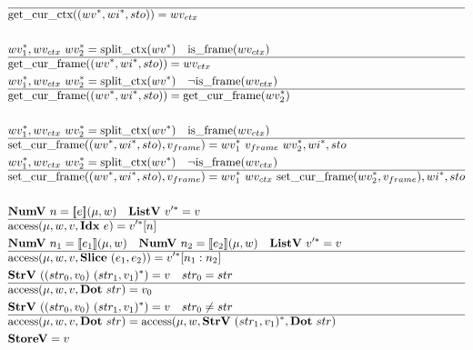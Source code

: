 \begin{align*}
  \hline
  &\getcurctx((\seq{wv}, \seq{wi}, sto)) = wv_{ctx} \\
%
\newline \\
  &\seq{wv_1}, wv_{ctx} ~ \seq{wv_2} = \splitctx(\seq{wv}) \quad \isframe(wv_{ctx}) \\
  \hline
  &\getcurframe((\seq{wv}, \seq{wi}, sto)) = wv_{ctx} \\
  &\seq{wv_1}, wv_{ctx} ~ \seq{wv_2} = \splitctx(\seq{wv}) \quad \neg \isframe(wv_{ctx}) \\
  \hline
  &\getcurframe((\seq{wv}, \seq{wi}, sto)) = \getcurframe(\seq{wv_2}) \\
%
\newline \\
  &\seq{wv_1}, wv_{ctx} ~ \seq{wv_2} = \splitctx(\seq{wv}) \quad \isframe(wv_{ctx}) \\
  \hline
  &\setcurframe((\seq{wv}, \seq{wi}, sto), v_{frame})
  =
  \seq{wv_1} ~ v_{frame} ~ \seq{wv_2}, \seq{wi}, sto \\
  &\seq{wv_1}, wv_{ctx} ~ \seq{wv_2} = \splitctx(\seq{wv}) \quad \neg \isframe(wv_{ctx}) \\
  \hline
  &\setcurframe((\seq{wv}, \seq{wi}, sto), v_{frame})
  =
  \seq{wv_1} ~ wv_{ctx} ~ \setcurframe(\seq{wv_2}, v_{frame}), \seq{wi}, sto \\
%
\newline \\
  &\numv ~ n = \sem{e}(\mu, w) \quad \listv ~ \seq{v'} = v \\
  \hline
  &\access(\mu, w, v, \idxp ~ e) = \seq{v'}[n] \\
  &\numv ~ n_1 = \sem{e_1}(\mu, w) \quad
  \numv ~ n_2 = \sem{e_2}(\mu, w) \quad
  \listv ~ \seq{v'} = v \\
  \hline
  &\access(\mu, w, v, \slicep ~ (e_1, e_2)) = \seq{v'}[n_1: n_2] \\
  &\strv ~ ((str_0, v_0) ~ \seq{(str_1, v_1)}) = v \quad
  str_0 = str \\
  \hline
  &\access(\mu, w, v, \dotp ~ str) = v_0 \\
  &\strv ~ ((str_0, v_0) ~ \seq{(str_1, v_1)}) = v \quad
  str_0 \not= str \\
  \hline
  &\access(\mu, w, v, \dotp ~ str) = \access(\mu, w, \strv ~ \seq{(str_1, v_1)}, \dotp ~ str) \\
  &\storev = v \\

\end{align*}
